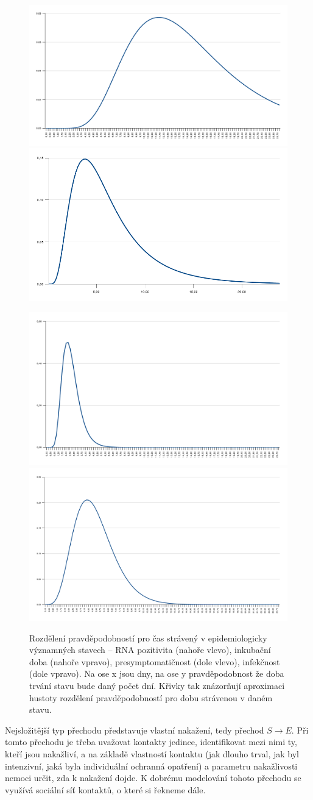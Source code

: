 \begin{figure}%
\centerline{%
\includegraphics[width=0.49\columnwidth]{pic/time-rna}%
\includegraphics[width=0.49\columnwidth]{pic/time-ink}}
\centerline{%
\includegraphics[width=0.49\columnwidth]{pic/time-pre}%
\includegraphics[width=0.49\columnwidth]{pic/time-inf}%
}
\caption{Rozdělení pravděpodobností pro čas strávený v epidemiologicky významných stavech -- RNA pozitivita (nahoře vlevo), inkubační doba (nahoře vpravo), presymptomatičnost (dole vlevo), infekčnost (dole vpravo). Na ose x jsou dny, na ose y pravděpodobnost že doba trvání stavu bude daný počet dní. Křivky tak znázorňují aproximaci hustoty rozdělení pravděpodobností pro dobu strávenou v daném stavu.}%
\label{fig:times-states}%
\end{figure}

Nejsložitější typ přechodu představuje vlastní nakažení, tedy přechod $S\to E$. Při tomto přechodu je třeba uvažovat kontakty jedince, identifikovat mezi nimi ty, kteří jsou nakažliví, a na základě vlastností kontaktu (jak dlouho trval, jak byl intenzivní, jaká byla individuální ochranná opatření) a parametru nakažlivosti nemoci určit, zda k nakažení dojde. K dobrému modelování tohoto přechodu se využívá sociální síť kontaktů, o které si řekneme dále. 

